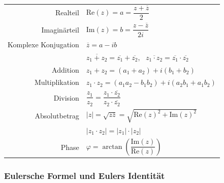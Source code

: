 \documentclass[a4paper, fontsize = 8pt, landscape]{scrartcl}
\renewcommand{\Im}[1]{\text{Im}(#1)}
\renewcommand{\Re}[1]{\text{Re}(#1)}
\begin{document}
\begin{multicols*}{3}
    \begin{center}
        \renewcommand{\arraystretch}{1.25}
        \begin{tabular}{r l} \toprule
            Realteil             & $\Re{z} = a = \dfrac{z + \overline{z}}{2}$                                                                                    \\
            Imaginärteil         & $\Im{z} = b = \dfrac{z - \overline{z}}{2i}$                                                                                   \\ \midrule
            Komplexe Konjugation & $\overline{z} = a - ib$                                                                                                       \\
                                 & $\overline{z_1 + z_2} = \overline{z_1} + \overline{z_2}$, \, $\overline{z_1 \cdot z_2} = \overline{z_1} \cdot \overline{z_2}$ \\ \midrule
            Addition             & $z_1 + z_2 = (a_1 + a_2) + i(b_1 + b_2)$                                                                                      \\
            Multiplikation       & $z_1 \cdot z_2 = (a_1 a_2 - b_1 b_2) + i(a_2 b_1 + a_1 b_2)$                                                                  \\
            Division             & $\dfrac{z_1}{z_2} = \dfrac{z_1 \cdot \overline{z_2}}{z_2 \cdot \overline{z_2}}$                                               \\ \midrule
            Absolutbetrag        & $| z | = \sqrt{z \overline{z}} = \sqrt{\Re{z}^2 + \Im{z}^2}$                                                                  \\
                                 & $|z_1 \cdot z_2| = |z_1| \cdot |z_2|$                                                                                         \\
            Phase                & $\varphi = \arctan \left( \dfrac{\Im{z}}{\Re{z}} \right)$                                                                     \\ \bottomrule
        \end{tabular}
    \end{center}

    \subsubsection{Eulersche Formel und Eulers Identität}


\end{multicols*}
\end{document}
